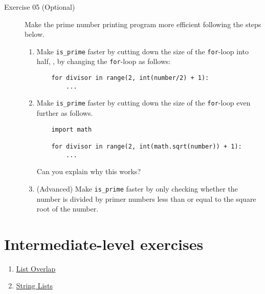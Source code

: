 \documentclass{article}
\begin{document}
\begin{description}
\item[Exercise 05 (Optional)]
Make the prime number printing program more efficient following the steps below.

\begin{enumerate}
\item Make \verb+is_prime+ faster by cutting down the size of the \verb+for+-loop into half,
\ie, by changing the \verb+for+-loop as follows:
\begin{verbatim}
    for divisor in range(2, int(number/2) + 1):
        ...
\end{verbatim}

\item Make \verb+is_prime+ faster by cutting down the size of the \verb+for+-loop even further
as follows.
\begin{verbatim}
    import math

    for divisor in range(2, int(math.sqrt(number)) + 1):
        ...
\end{verbatim}

Can you explain why this works?

\item (Advanced) Make \verb+is_prime+ faster by only checking whether the number is divided by primer numbers less than or equal to
the square root of the number.

\end{enumerate}
\end{description}


\section{Intermediate-level exercises}

\begin{enumerate}
\item 
\href{https://www.practicepython.org/exercise/2014/03/05/05-list-overlap.html}{List Overlap}

\item
\href{https://www.practicepython.org/exercise/2014/03/12/06-string-lists.html}{String Lists}

\end{enumerate}
\end{document}
